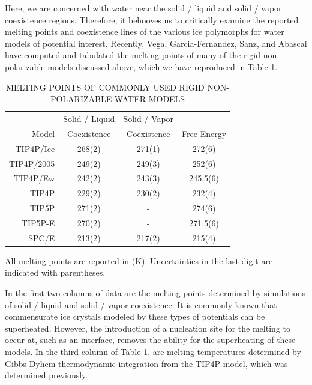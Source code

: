 Here, we are concerned with water near the solid / liquid and solid /
vapor coexistence regions. Therefore, it behooves us to critically
examine the reported melting points and coexistence lines of the
various ice polymorphs for water models of potential
interest. Recently, Vega, Garcia-Fernandez, Sanz, and Abascal have
computed and tabulated the melting points of many of the rigid
non-polarizable models discussed above, which we have reproduced in
Table
\ref{tab:meltingPoints}.\cite{Abascal2005,Abascal2005a,Vega2005,Vega2005a,Fernandez2006,Vega2006a}

\begin{table}[h]
\centering
\caption{MELTING POINTS OF COMMONLY USED RIGID NON-POLARIZABLE
        WATER MODELS \cite{Abascal2005,Abascal2005a,Vega2005,Vega2005a,Fernandez2006,Vega2006a}\label{tab:meltingPoints}} 
\begin{tabular}{rccc}
\hline \hline
& Solid / Liquid & Solid / Vapor & \\
Model & Coexistence & Coexistence & Free Energy \\
\hline
TIP4P/Ice & 268(2) & 271(1) & 272(6) \\
TIP4P/2005 & 249(2) & 249(3) & 252(6) \\
TIP4P/Ew & 242(2) & 243(3) & 245.5(6) \\
TIP4P & 229(2) & 230(2) & 232(4) \\
TIP5P & 271(2) & - & 274(6) \\
TIP5P-E & 270(2) & - & 271.5(6) \\
SPC/E & 213(2) & 217(2) & 215(4) \\
\hline \hline
\end{tabular}
\flushleft
All melting points are reported in (K). 
Uncertainties in the last digit are indicated with parentheses. \\
\end{table}

In the first two columns of data are the melting points determined by
simulations of solid / liquid and solid / vapor coexistence. It is
commonly known that commensurate ice crystals modeled by these types
of potentials can be superheated.\cite{Vega2006a} However, the
introduction of a nucleation site for the melting to occur at, such as
an interface, removes the ability for the superheating of these
models. In the third column of Table \ref{tab:meltingPoints}, are
melting temperatures determined by Gibbs-Dyhem thermodynamic
integration\cite{Kofke1993} from the TIP4P model, which was determined
previously.\cite{Sanz2004}

